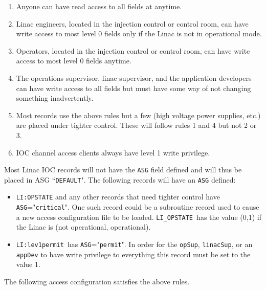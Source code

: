 \begin{enumerate}\item Anyone can have read access to all fields at anytime.

\item Linac engineers, located in the injection control or control room, can have write access to most level 0 fields only if 
the Linac is not in operational mode.

\item Operators, located in the injection control or control room, can have write access to most level 0 fields anytime.

\item The operations supervisor, linac supervisor, and the application developers can have write access to all fields but 
must have some way of not changing something inadvertently.

\item Most records use the above rules but a few (high voltage power supplies, etc.) are placed under tighter control. 
These will follow rules 1 and 4 but not 2 or 3.

\item IOC channel access clients always have level 1 write privilege.

\end{enumerate}Most Linac IOC records will not have the \verb|ASG| field defined and will thus be placed in ASG ``\verb|DEFAULT|". The following 
records will have an \verb|ASG| defined:

\begin{itemize}\item \verb|LI:OPSTATE| and any other records that need tighter control have \verb|ASG|="\verb|critical|". One such record could be 
a subroutine record used to cause a new access configuration file to be loaded. \verb|LI_OPSTATE |has the value (0,1) 
if the Linac is (not operational, operational).

\item \verb|LI:lev1permit |has \verb|ASG|="\verb|permit|". In order for the \verb|opSup|, \verb|linacSup|, or an \verb|appDev| to have write 
privilege to everything this record must be set to the value 1.

\end{itemize}The following access configuration satisfies the above rules.

